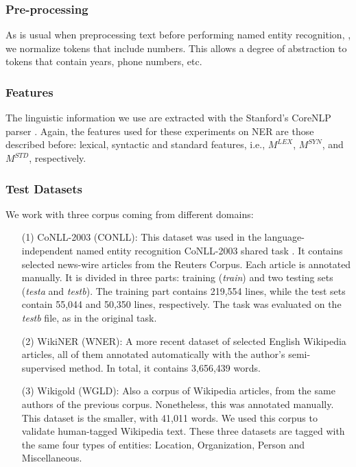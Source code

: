 \documentclass{llncs}
\begin{document}
\subsubsection{Pre-processing}

As is usual when preprocessing text before performing named entity recognition, \cite{RatinovR09}, we normalize tokens that include numbers. 
This allows a degree of abstraction to tokens that contain years, phone numbers, etc. 

\subsubsection{Features}
The linguistic information we use are extracted with the Stanford's CoreNLP parser \cite{manning2014}. Again, the features used for these experiments on NER are those described before: lexical, syntactic and standard features, i.e., $M^{LEX}$, $M^{SYN}$, and $M^{STD}$, respectively. 

\subsubsection{Test Datasets}We work with three corpus coming from different domains:
\begin{itemize}
\item [(1)] CoNLL-2003 (CONLL): This dataset was used in the language-independent named entity recognition CoNLL-2003 shared task \cite{SangM03}. It contains selected news-wire articles from the Reuters Corpus. Each article is annotated manually. It is divided in three parts:  training (\textit{train}) and two testing sets (\textit{testa} and \textit{testb}). The training part contains 219,554 lines, while the test sets contain 55,044 and 50,350 lines, respectively. The task was evaluated on the \textit{testb} file, as in the original task.
\item [(2)]WikiNER (WNER): A more recent dataset \cite{Balasuriya2009} of selected English \allowbreak Wikipedia articles, all of them annotated automatically with the author's semi-supervised \allowbreak method. In total, it contains 3,656,439 words. 
\item[(3)] Wikigold (WGLD): Also a corpus of Wikipedia articles, from the same authors of the previous corpus. Nonetheless, this was annotated manually. This dataset is the smaller, with 41,011 words. We used this corpus to validate human-tagged Wikipedia text. These three datasets are tagged with the same four types of entities: Location, Organization, Person and Miscellaneous.


\end{itemize}
%
\end{document}
